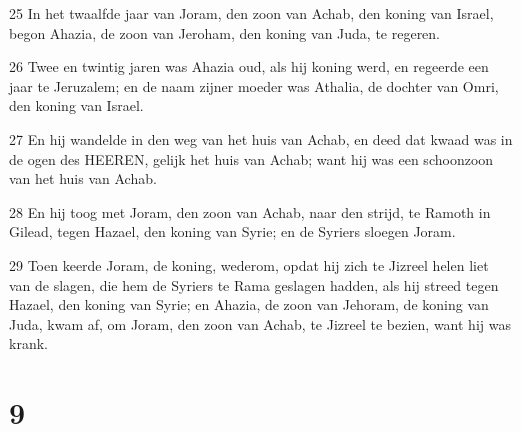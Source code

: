 \par 25 In het twaalfde jaar van Joram, den zoon van Achab, den koning van Israel, begon Ahazia, de zoon van Jeroham, den koning van Juda, te regeren.
\par 26 Twee en twintig jaren was Ahazia oud, als hij koning werd, en regeerde een jaar te Jeruzalem; en de naam zijner moeder was Athalia, de dochter van Omri, den koning van Israel.
\par 27 En hij wandelde in den weg van het huis van Achab, en deed dat kwaad was in de ogen des HEEREN, gelijk het huis van Achab; want hij was een schoonzoon van het huis van Achab.
\par 28 En hij toog met Joram, den zoon van Achab, naar den strijd, te Ramoth in Gilead, tegen Hazael, den koning van Syrie; en de Syriers sloegen Joram.
\par 29 Toen keerde Joram, de koning, wederom, opdat hij zich te Jizreel helen liet van de slagen, die hem de Syriers te Rama geslagen hadden, als hij streed tegen Hazael, den koning van Syrie; en Ahazia, de zoon van Jehoram, de koning van Juda, kwam af, om Joram, den zoon van Achab, te Jizreel te bezien, want hij was krank.

\chapter{9}

